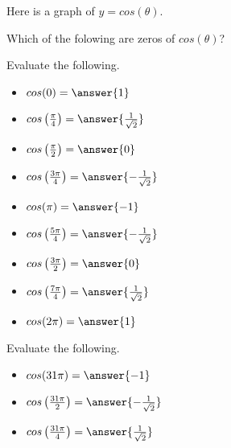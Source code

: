 \documentclass{ximera}
\author{Lee Wayand}
\begin{document}
Here is a graph of $y = cos(\theta)$.
\begin{center}
\end{center}




\begin{exercise} Which of the folowing are zeros of $cos(\theta)$? 

\begin{selectAll}
\end{selectAll}


\end{exercise}




\begin{exercise} Evaluate the following.

\begin{itemize}
\item $cos(0) = \answer{1}$
\item $cos\left(\frac{\pi}{4}\right) = \answer{\frac{1}{\sqrt{2}}}$
\item $cos\left(\frac{\pi}{2}\right) = \answer{0}$
\item $cos\left(\frac{3\pi}{4}\right) = \answer{-\frac{1}{\sqrt{2}}}$
\item $cos(\pi) = \answer{-1}$
\item $cos\left(\frac{5\pi}{4}\right) = \answer{-\frac{1}{\sqrt{2}}}$
\item $cos\left(\frac{3\pi}{2}\right) = \answer{0}$
\item $cos\left(\frac{7\pi}{4}\right) = \answer{\frac{1}{\sqrt{2}}}$
\item $cos(2\pi) = \answer{1}$
\end{itemize}

\end{exercise}






\begin{exercise} Evaluate the following.

\begin{itemize}
\item $cos(31\pi) = \answer{-1}$
\item $cos\left(\frac{31\pi}{2}\right) = \answer{-\frac{1}{\sqrt{2}}}$
\item $cos\left(\frac{31\pi}{4}\right) = \answer{\frac{1}{\sqrt{2}}}$
\end{itemize}

\end{exercise}
\end{document}
